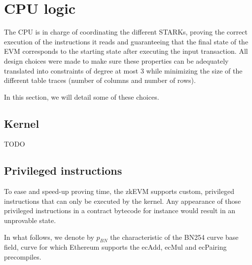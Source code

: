\section{CPU logic}
\label{cpulogic}

The CPU is in charge of coordinating the different STARKs, proving the correct execution of the instructions it reads and guaranteeing
that the final state of the EVM corresponds to the starting state after executing the input transaction. All design choices were made 
to make sure these properties can be adequately translated into constraints of degree at most 3 while minimizing the size of the different
table traces (number of columns and number of rows).

In this section, we will detail some of these choices.

\subsection{Kernel}

TODO

\subsection{Privileged instructions}

To ease and speed-up proving time, the zkEVM supports custom, privileged instructions that can only be executed by the kernel.
Any appearance of those privileged instructions in a contract bytecode for instance would result in an unprovable state.

In what follows, we denote by $p_{BN}$ the characteristic of the BN254 curve base field, curve for which Ethereum supports the 
ecAdd, ecMul and ecPairing precompiles.

